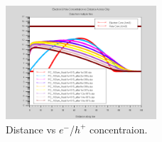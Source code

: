 \documentclass[12pt]{article}
\begin{document}
\begin{figure}[H]
  \centering
  \includegraphics[width=0.5\textwidth]{n8}
  \caption{Distance vs $e^-$/$h^+$ concentraion.}
\end{figure}



\end{document}
